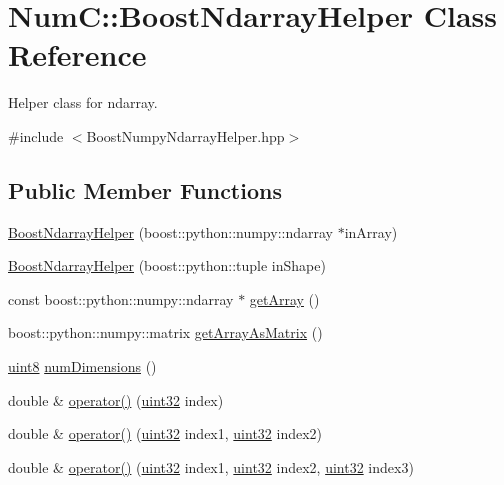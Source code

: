 \hypertarget{class_num_c_1_1_boost_ndarray_helper}{}\section{NumC\+:\+:Boost\+Ndarray\+Helper Class Reference}
\label{class_num_c_1_1_boost_ndarray_helper}


Helper class for ndarray.  




{\ttfamily \#include $<$Boost\+Numpy\+Ndarray\+Helper.\+hpp$>$}

\subsection*{Public Member Functions}
\begin{DoxyCompactItemize}
\item 
\mbox{\hyperlink{class_num_c_1_1_boost_ndarray_helper_a48328556cee91ae3f673f3b68548d21a}{Boost\+Ndarray\+Helper}} (boost\+::python\+::numpy\+::ndarray $\ast$in\+Array)
\item 
\mbox{\hyperlink{class_num_c_1_1_boost_ndarray_helper_ae267e8330b5ef7072ab9bb56cfa7e831}{Boost\+Ndarray\+Helper}} (boost\+::python\+::tuple in\+Shape)
\item 
const boost\+::python\+::numpy\+::ndarray $\ast$ \mbox{\hyperlink{class_num_c_1_1_boost_ndarray_helper_acceb3bb2db61aeecba91336eb13feba0}{get\+Array}} ()
\item 
boost\+::python\+::numpy\+::matrix \mbox{\hyperlink{class_num_c_1_1_boost_ndarray_helper_a9800430d89ded6d79b7b143b0dca5292}{get\+Array\+As\+Matrix}} ()
\item 
\mbox{\hyperlink{namespace_num_c_a60b2e2f49e1ff61059731c154e560869}{uint8}} \mbox{\hyperlink{class_num_c_1_1_boost_ndarray_helper_adbcf2213f2b5469b558c288ae18e4825}{num\+Dimensions}} ()
\item 
double \& \mbox{\hyperlink{class_num_c_1_1_boost_ndarray_helper_a55c656e959263b99cd66d584c2218dc4}{operator()}} (\mbox{\hyperlink{namespace_num_c_ae685802ca6d3035f2b400b081e3953fa}{uint32}} index)
\item 
double \& \mbox{\hyperlink{class_num_c_1_1_boost_ndarray_helper_afc3d675f295e685a7c89eead2da0d332}{operator()}} (\mbox{\hyperlink{namespace_num_c_ae685802ca6d3035f2b400b081e3953fa}{uint32}} index1, \mbox{\hyperlink{namespace_num_c_ae685802ca6d3035f2b400b081e3953fa}{uint32}} index2)
\item 
double \& \mbox{\hyperlink{class_num_c_1_1_boost_ndarray_helper_a9424faff33849081e20aecf14713cb14}{operator()}} (\mbox{\hyperlink{namespace_num_c_ae685802ca6d3035f2b400b081e3953fa}{uint32}} index1, \mbox{\hyperlink{namespace_num_c_ae685802ca6d3035f2b400b081e3953fa}{uint32}} index2, \mbox{\hyperlink{namespace_num_c_ae685802ca6d3035f2b400b081e3953fa}{uint32}} index3)

\end{DoxyCompactItemize}
